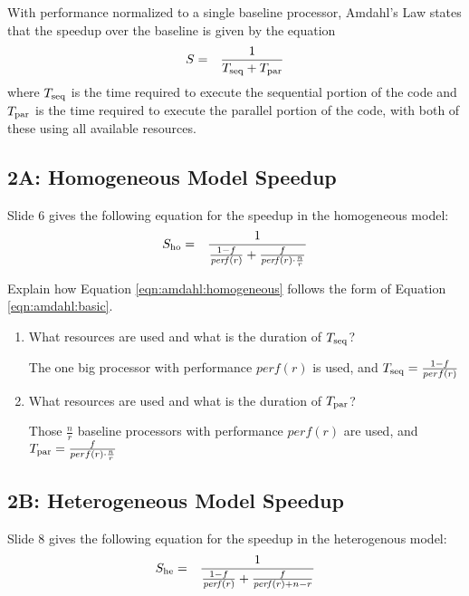 \documentclass[11pt]{article}
\newenvironment{answer}{\begin{minipage}[c][2.0in]{\textwidth}}{\end{minipage}}
\begin{document}
With performance normalized to a single baseline processor, Amdahl's Law
states that the speedup over the baseline is given by the equation
\begin{eqnarray}
S & = & \frac{1}{T_{\rm seq} + T_{\rm par}} \label{eqn:amdahl:basic}
\end{eqnarray}
where $T_{\rm seq}$ is the time required to execute the sequential
portion of the code and $T_{\rm par}$ is the time required to execute
the parallel portion of the code, with both of these using all
available resources.

\newpage

\subsection*{2A: Homogeneous Model Speedup}
Slide 6 gives the following equation for the speedup in the homogeneous model:
\begin{eqnarray}
S_{\rm ho} & = & \frac{1}{\frac{1-f}{{\it perf}(r)} + \frac{f}{{\it
      perf}(r) \cdot  \frac{n}{r}}} \label{eqn:amdahl:homogeneous}
\end{eqnarray}

Explain how Equation \ref{eqn:amdahl:homogeneous} follows the form of
Equation \ref{eqn:amdahl:basic}.
\begin{enumerate}
\item
What resources are used and what is the
duration of $T_{\rm seq}$?

\begin{answer}

The one big processor with performance $perf(r)$ is used, and $T_{\rm seq}=\frac{1-f}{perf(r)}$

\end{answer}
\item
 What resources are used and what is the
duration of $T_{\rm par}$?

\begin{answer}

Those $\frac{n}{r}$ baseline processors with performance $perf(r)$ are used, 
and $T_{\rm par}=\frac{f}{perf(r)\cdot\frac{n}{r}}$

\end{answer}
\end{enumerate}

\newpage
\subsection*{2B: Heterogeneous Model Speedup}
Slide 8 gives the following equation for the speedup in the heterogenous model:
\begin{eqnarray}
S_{\rm he} & = & \frac{1}{\frac{1-f}{{\it perf}(r)} + 
\frac{f}{{\it perf}(r) +  n -r}}  \label{eqn:amdahl:heterogeneous}
\end{eqnarray}
\end{document}
